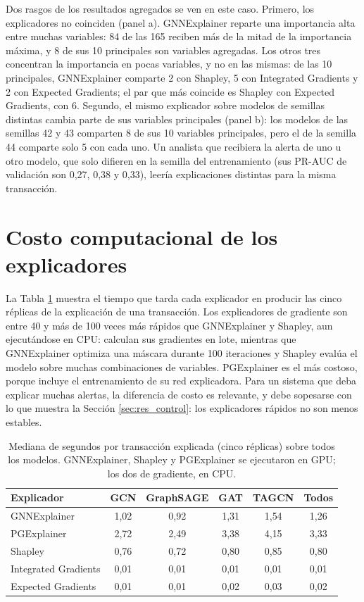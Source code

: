 Dos rasgos de los resultados agregados se ven en este caso. Primero, los explicadores no
coinciden (panel a). GNNExplainer reparte una importancia alta entre muchas variables: 84 de las
165 reciben más de la mitad de la importancia máxima, y 8 de sus 10 principales son variables
agregadas. Los otros tres concentran la importancia en pocas variables, y no en las mismas: de
las 10 principales, GNNExplainer comparte 2 con Shapley, 5 con Integrated Gradients y 2 con
Expected Gradients; el par que más coincide es Shapley con Expected Gradients, con 6. Segundo,
el mismo explicador sobre modelos de semillas distintas cambia parte de sus variables
principales (panel b): los modelos de las semillas 42 y 43 comparten 8 de sus 10 variables
principales, pero el de la semilla 44 comparte solo 5 con cada uno. Un analista que recibiera
la alerta de uno u otro modelo, que solo difieren en la semilla del entrenamiento (sus PR-AUC
de validación son 0,27, 0,38 y 0,33), leería explicaciones distintas para la misma
transacción.

\section{Costo computacional de los explicadores}\label{sec:res_costo}

La Tabla \ref{tab:costo} muestra el tiempo que tarda cada explicador en producir las cinco
réplicas de la explicación de una transacción. Los explicadores de gradiente son entre 40 y más
de 100 veces más rápidos que GNNExplainer y Shapley, aun ejecutándose en CPU: calculan sus
gradientes en lote, mientras que GNNExplainer optimiza una máscara durante 100 iteraciones y
Shapley evalúa el modelo sobre muchas combinaciones de variables. PGExplainer es el más costoso,
porque incluye el entrenamiento de su red explicadora. Para un sistema que deba explicar muchas
alertas, la diferencia de costo es relevante, y debe sopesarse con lo que muestra la Sección
\ref{sec:res_control}: los explicadores rápidos no son menos estables.

\begin{table}[ht]
\centering
\caption{Mediana de segundos por transacción explicada (cinco réplicas) sobre todos los
modelos. GNNExplainer, Shapley y PGExplainer se ejecutaron en GPU; los dos de gradiente, en CPU.}
\label{tab:costo}
\small
\begin{tabular}{lccccc}
\toprule
Explicador & GCN & GraphSAGE & GAT & TAGCN & Todos \\
\midrule
GNNExplainer & 1{,}02 & 0{,}92 & 1{,}31 & 1{,}54 & 1{,}26 \\
PGExplainer & 2{,}72 & 2{,}49 & 3{,}38 & 4{,}15 & 3{,}33 \\
Shapley & 0{,}76 & 0{,}72 & 0{,}80 & 0{,}85 & 0{,}80 \\
Integrated Gradients & 0{,}01 & 0{,}01 & 0{,}01 & 0{,}01 & 0{,}01 \\
Expected Gradients & 0{,}01 & 0{,}01 & 0{,}02 & 0{,}03 & 0{,}02 \\
\bottomrule
\end{tabular}
\end{table}

